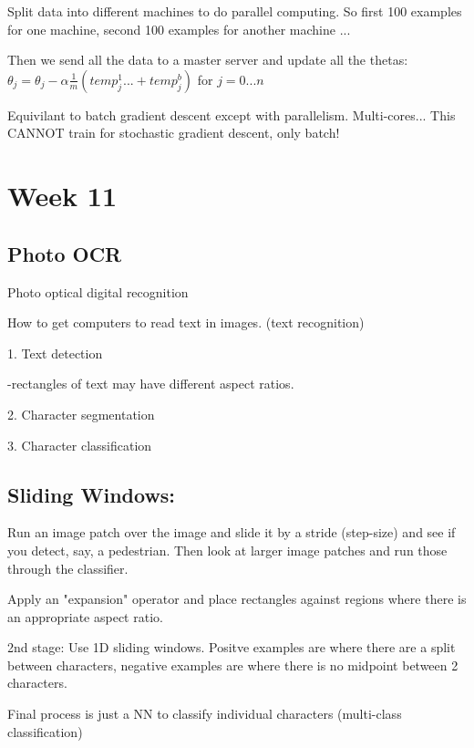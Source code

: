 \documentclass{article}
\begin{document}
Split data into different machines to do parallel computing. So first 100 examples for one machine, second 100 examples for another machine ...

Then we send all the data to a master server and update all the thetas: $\theta_j = \theta_j - \alpha \frac{1}{m} ( temp_j^1 ... + temp_j^b )$ for $ j = 0 ... n$

Equivilant to batch gradient descent except with parallelism. Multi-cores... This CANNOT train for stochastic gradient descent, only batch!




\section{Week 11}

\subsection{Photo OCR}

Photo optical digital recognition

How to get computers to read text in images. (text recognition)

1. Text detection

-rectangles of text may have different aspect ratios. 

2. Character segmentation

3. Character classification




\subsection{Sliding Windows:}


Run an image patch over the image and slide it by a stride (step-size) and see if you detect, say, a pedestrian. Then look at larger image patches and run those through the classifier.

Apply an "expansion" operator and place rectangles against regions where there is an appropriate aspect ratio.

2nd stage: Use 1D sliding windows. Positve examples are where there are a split between characters, negative examples are where there is no midpoint between 2 characters.

Final process is just a NN to classify individual characters (multi-class classification)
\end{document}
